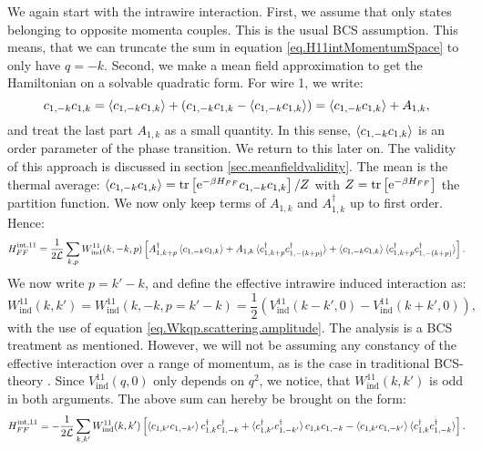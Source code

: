 We again start with the intrawire interaction. First, we assume that only states belonging to opposite momenta couples. This is the usual BCS assumption. This means, that we can truncate the sum in equation \eqref{eq.H11intMomentumSpace} to only have $q = -k$. Second, we make a mean field approximation to get the Hamiltonian on a solvable quadratic form. For wire 1, we write:
\begin{equation}
c_{1, -k}c_{1, k} = \braket{ c_{1, -k}c_{1, k} } + \left(c_{1, -k} c_{1, k} - \braket{ c_{1, -k}c_{1, k} } \right) = \braket{ c_{1, -k}c_{1, k} } + A_{1,k}, \nonumber 
\end{equation}
and treat the last part $A_{1,k}$ as a small quantity. In this sense, $\braket{ c_{1, -k}c_{1, k} }$ is an order parameter of the phase transition. We return to this later on. The validity of this approach is discussed in section \ref{sec.meanfieldvalidity}. The mean is the thermal average: $\braket{ c_{1, -k}c_{1, k} } = \operatorname{tr}\left[\text{e}^{-\beta H_{FF}}c_{1, -k}c_{1, k} \right]/Z$ with $Z = \operatorname{tr}\left[\text{e}^{-\beta H_{FF}}\right]$ the partition function. We now only keep terms of $A_{1,k}$ and $A^\dagger_{1,k}$ up to first order. Hence:
\begin{equation}
H^\text{int,11}_{FF} = \frac{1}{2\mathcal{L}} \sum_{k, p} W^{11}_{\text{ind}}(k, -k, p)\left[A^\dagger_{1, k + p}\braket{c_{1, -k}c_{1,k}} + A_{1, k}\braket{c^\dagger_{1, k + p}c^\dagger_{1, -(k+p)}} + \braket{c_{1, -k}c_{1,k}}\braket{c^\dagger_{1, k + p}c^\dagger_{1, -(k + p)}}\right]. 
\label{eq.H11int.meanfield.firstexpression}
\end{equation}
We now write $p = k' - k$, and define the effective intrawire induced interaction as:
\begin{equation}
W^{11}_{\text{ind}}(k, k') = W^{11}_{\text{ind}}(k, -k, p = k' - k) = \frac{1}{2}\left(V^{11}_{\text{ind}}\left( k - k', 0 \right) - V^{11}_{\text{ind}}\left( k + k', 0 \right) \right), 
\label{eq.EffectiveInteraction.intrawire}
\end{equation}
with the use of equation \eqref{eq.Wkqp.scattering.amplitude}. The analysis is a BCS treatment as mentioned. However, we will not be assuming any constancy of the effective interaction over a range of momentum, as is the case in traditional BCS-theory \cite[chapter 3]{Tinkham}. Since $V^{11}_{\text{ind}}(q,0)$ only depends on $q^2$, we notice, that $W^{11}_{\text{ind}}(k, k')$ is odd in both arguments. The above sum can hereby be brought on the form:
\begin{equation}
H^\text{int,11}_{FF} = -\frac{1}{2\mathcal{L}}\sum_{k,k'} W^{11}_{\text{ind}}(k, k')\left[ \braket{ c_{1, k'}c_{1, -k'}} c^\dagger_{1,k} c^\dagger_{1, -k} + \braket {c^\dagger_{1, k'}c^\dagger_{1, -k'}} c_{1, k} c_{1, -k} - \braket {c_{1, k'}c_{1, -k'}} \braket {c^\dagger_{1, k}c^\dagger_{1, -k}} \right]. \nonumber
\end{equation}
